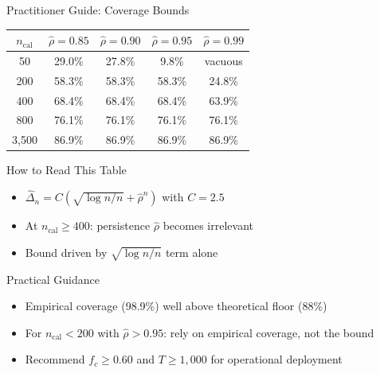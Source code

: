 \documentclass[9pt, aspectratio=169, t]{beamer}
\begin{document}
\begin{frame}{Practitioner Guide: Coverage Bounds}
	\vspace{-0.3cm}
	{\scriptsize
	\begin{center}
	\begin{tabular}{@{}ccccc@{}}
	\toprule
	$n_{\mathrm{cal}}$ & $\hat\rho = 0.85$ & $\hat\rho = 0.90$ & $\hat\rho = 0.95$ & $\hat\rho = 0.99$ \\
	\midrule
	50   & 29.0\% & 27.8\% &  9.8\% & vacuous \\
	200  & 58.3\% & 58.3\% & 58.3\% & 24.8\% \\
	400  & 68.4\% & 68.4\% & 68.4\% & 63.9\% \\
	800  & 76.1\% & 76.1\% & 76.1\% & 76.1\% \\
	3{,}500 & 86.9\% & 86.9\% & 86.9\% & 86.9\% \\
	\bottomrule
	\end{tabular}
	\end{center}
	}
	\vspace{0mm}
	{\scriptsize
	\begin{block}{How to Read This Table}
		\begin{itemize}\setlength{\itemsep}{1pt}
			\item $\hat\Delta_n = C(\sqrt{\log n / n} + \hat\rho^{n})$ with $C = 2.5$
			\item At $n_{\mathrm{cal}} \geq 400$: persistence $\hat\rho$ becomes irrelevant
			\item Bound driven by $\sqrt{\log n / n}$ term alone
		\end{itemize}
	\end{block}
	\begin{exampleblock}{Practical Guidance}
		\begin{itemize}\setlength{\itemsep}{1pt}
			\item Empirical coverage (98.9\%) well above theoretical floor (88\%)
			\item For $n_{\mathrm{cal}} < 200$ with $\hat\rho > 0.95$: rely on empirical coverage, not the bound
			\item Recommend $f_c \geq 0.60$ and $T \geq 1{,}000$ for operational deployment
		\end{itemize}
	\end{exampleblock}
	}
\end{frame}
\end{document}
